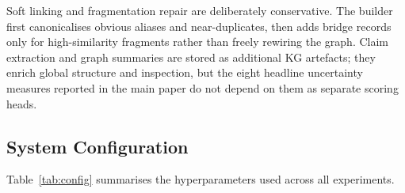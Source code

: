 Soft linking and fragmentation repair are deliberately conservative.
The builder first canonicalises obvious aliases and near-duplicates, then
adds bridge records only for high-similarity fragments rather than freely
rewiring the graph.
Claim extraction and graph summaries are stored as additional KG artefacts;
they enrich global structure and inspection, but the eight headline
uncertainty measures reported in the main paper do not depend on them as
separate scoring heads.

\subsection{System Configuration}
\label{sec:appendix_config}

Table~\ref{tab:config} summarises the hyperparameters used across all
experiments.


